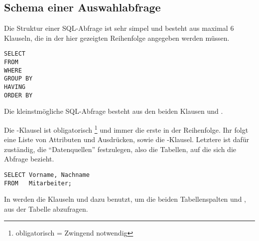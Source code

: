       \subsection{Schema einer Auswahlabfrage}
        Die Struktur einer SQL-Abfrage ist sehr simpel und besteht aus maximal 6 Klauseln, die in der hier gezeigten Reihenfolge angegeben werden m\"ussen.
        \begin{lstlisting}[emph={WHERE,GROUP,BY,HAVING,ORDER}, emphstyle=\color{lightgray}, language=oracle_sql, label=sql01_01]
SELECT
FROM
WHERE
GROUP BY
HAVING
ORDER BY
        \end{lstlisting}
        \begin{merke}
          Die kleinstm\"ogliche SQL-Abfrage besteht aus den beiden Klausen  und .
        \end{merke}

        Die -Klausel ist obligatorisch \footnote{obligatorisch = Zwingend notwendig} und immer die erste in der Reihenfolge. Ihr folgt eine Liste von Attributen und Ausdr\"ucken, sowie die -Klausel. Letztere ist daf\"ur zust\"andig, die \enquote{Datenquellen} festzulegen, also die Tabellen, auf die sich die Abfrage bezieht.
        \begin{lstlisting}[language=oracle_sql,caption={Eine einfache Auswahlabfrage in Oracle},label=sql01_02]
SELECT Vorname, Nachname
FROM   Mitarbeiter;
        \end{lstlisting}
        In  werden die Klauseln  und  dazu benutzt, um die beiden Tabellenspalten  und , aus der Tabelle  abzufragen.


